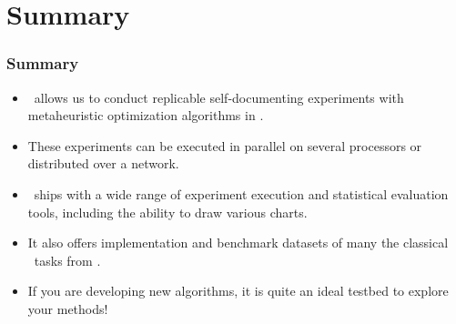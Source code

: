 \documentclass[aspectratio=169,mathserif,notheorems]{beamer}%
\begin{document}
\section{Summary}%
%
\begin{frame}%
\frametitle{Summary}%
\begin{itemize}%
\item \moptipy\ allows us to conduct replicable self-documenting experiments with \gls{metaheuristic} optimization algorithms in \python.%
\item<2-> These experiments can be executed in parallel on several processors or distributed over a network.%
%
\item<3-> \moptipy\ ships with a wide range of experiment execution and statistical evaluation tools, including the ability to draw various charts.%
%
\item<4-> It also offers implementation and benchmark datasets of many the classical \npHard\ tasks from .%
%
\item<5-> If you are developing new algorithms, it is quite an ideal testbed to explore your methods!%
\end{itemize}%
\end{frame}%
%
%
%
\endPresentation%
\end{document}
